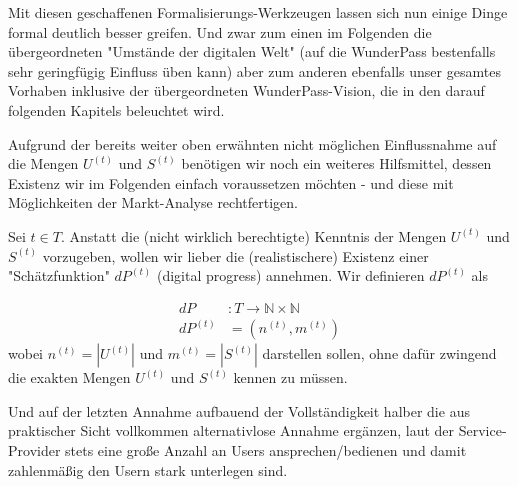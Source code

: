 Mit diesen geschaffenen Formalisierungs-Werkzeugen lassen sich nun einige Dinge formal deutlich besser greifen. Und zwar zum einen im Folgenden die übergeordneten "Umstände der digitalen Welt" (auf die WunderPass bestenfalls sehr geringfügig Einfluss üben kann) aber zum anderen ebenfalls unser gesamtes Vorhaben inklusive der übergeordneten WunderPass-Vision, die in den darauf folgenden Kapitels beleuchtet wird. 

\vspace{0.3cm}

Aufgrund der bereits weiter oben erwähnten nicht möglichen Einflussnahme auf die Mengen $U^{(t)}$ und $S^{(t)}$ benötigen wir noch ein weiteres Hilfsmittel, dessen Existenz wir im Folgenden einfach voraussetzen möchten - und diese mit Möglichkeiten der Markt-Analyse rechtfertigen.

\vspace{0.3cm}

\begin{Assumption}\label{assumptionOrakel}

Sei $t \in T$. Anstatt die (nicht wirklich berechtigte) Kenntnis der Mengen $U^{(t)}$ und $S^{(t)}$ vorzugeben, wollen wir lieber die (realistischere) Existenz einer "Schätzfunktion" $dP^{(t)}$ (digital progress) annehmen. Wir definieren $dP^{(t)}$ als

\begin{align*}
dP &: T \rightarrow \mathbb{N} \times \mathbb{N}  \\
dP^{(t)} &= \left(n^{(t)}, m^{(t)}\right)
\end{align*}
wobei $n^{(t)} = |U^{(t)}|$ und $m^{(t)} = |S^{(t)}|$ darstellen sollen, ohne dafür zwingend die exakten Mengen $U^{(t)}$ und $S^{(t)}$ kennen zu müssen.

\end{Assumption}

\vspace{0.3cm}

Und auf der letzten Annahme aufbauend der Vollständigkeit halber die aus praktischer Sicht vollkommen alternativlose Annahme ergänzen, laut der Service-Provider stets eine große Anzahl an Users ansprechen/bedienen und damit zahlenmäßig den Usern stark unterlegen sind.

\vspace{0.3cm}



